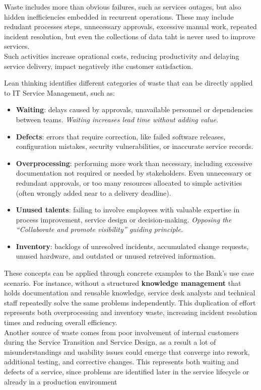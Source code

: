 Waste includes more than obvious failures, such as services outages, but also hidden inefficiencies embedded in recurrent operations. These may include redudant processes steps, unnecessary approvals, excessive manual work, repeated incident resolution, but even the collections of data taht is never used to improve services.\\
Such activities increase oprational costs, reducing productivity and delaying service delivery, impact negatively ithe customer satisfaction.

Lean thinking identifies different categories of waste that can be directly applied to IT Service Management, such as:
\begin{itemize}
    \item \textbf{Waiting}: delays caused by approvals, unavailable personnel or dependencies between teams. \textit{Waiting increases lead time without adding value.}
    \item \textbf{Defects}: errors that require correction, like failed software releases, configuration mistakes, security vulnerabilities, or inaccurate service records.
    \item \textbf{Overprocessing}: performing more work than necessary, including excessive documentation not required or needed by stakeholders. Even unnecessary or redundant approvals, or too many resources allocated to simple activities (often wrongly added near to a delivery deadline).
    \item \textbf{Unused talents}: failing to involve employees with valuable expertise in process improvement, service design or decision-making. \textit{Opposing the ``Collaborate and promote visibility'' guiding principle.}
    \item \textbf{Inventory}: backlogs of unresolved incidents, accumulated change requests, unused hardware, and outdated or unused retreived information.
\end{itemize}

These concepts can be applied through concrete examples to the Bank's use case scenario. For instance, without a structured \textbf{knowledge management} that holds documentation and reusable knowledge, service desk analysts and technical staff repeatedly solve the same problems independently. This duplication of effort represents both overprocessing and inventory waste, increasing incident resolution times and reducing overall efficiency.\\
Another source of waste comes from poor involvement of internal customers during the Service Transition and Service Design, as a result a lot of misunderstandings and usability issues could emerge that converge into rework, additional testing, and corrective changes. This represents both waiting and defects of a service, since problems are identified later in the service lifecycle or already in a production environment

